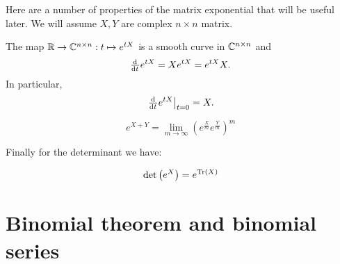 Here are a number of properties of the matrix exponential that will be useful later. We will assume $X, Y$ are complex $n\times n$ matrix.
\begin{eigenschap}
The map $\mathbb{R} \to \mathbb{C}^{n\times n}: t \mapsto e^{tX}$ is a smooth curve in $\mathbb{C}^{n\times n}$ and
\[ \od{}{t}e^{tX} = Xe^{tX} = e^{tX}X. \]
In particular,
\[ \left.\od{}{t}e^{tX}\right|_{t=0} = X. \]
\end{eigenschap}

\begin{eigenschap}
\[ e^{X+Y} = \lim_{m\to\infty} \left(e^{\frac{X}{m}}e^{\frac{Y}{m}}\right)^m \]
\end{eigenschap}
Finally for the determinant we have:
\begin{eigenschap}
\[\det \left(e^X\right) = e^{\operatorname{Tr}(X)}\]
\end{eigenschap}

\section{Binomial theorem and binomial series}